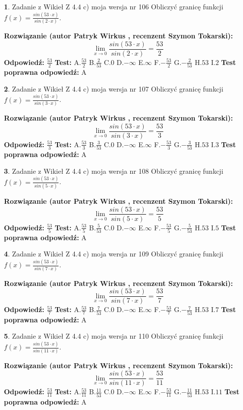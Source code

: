 \documentclass[12pt, a4paper]{article}
\theoremstyle{definition} %
\newtheorem{zad}{}
\newcommand{\zadStart}[1]{\begin{zad}#1\newline}
\newcommand{\zadStop}{\end{zad}}
\newcommand{\rozwStart}[2]{\noindent \textbf{Rozwiązanie (autor #1 , recenzent #2): }\newline}
\newcommand{\rozwStop}{\newline}
\newcommand{\odpStart}{\noindent \textbf{Odpowiedź:}\newline}
\newcommand{\odpStop}{\newline}
\newcommand{\testStart}{\noindent \textbf{Test:}\newline}
\newcommand{\testStop}{\newline}
\newcommand{\kluczStart}{\noindent \textbf{Test poprawna odpowiedź:}\newline}
\newcommand{\kluczStop}{\newline}
\begin{document}
\zadStart{Zadanie z Wikieł Z 4.4 c) moja wersja nr 106}
Obliczyć granicę funkcji $f(x)=\frac{sin(53\cdot x)}{sin(2\cdot x)}$.
\zadStop
\rozwStart{Patryk Wirkus}{Szymon Tokarski}
$$\lim\limits_{x\to 0}\frac{sin(53\cdot x)}{sin(2\cdot x)}=
\frac{53}{2}$$
\rozwStop
\odpStart
$\frac{53}{2}$
\odpStop
\testStart
A.$\frac{53}{2}$
B.$\frac{2}{53}$
C.$0$
D.$-\infty$
E.$\infty$
F.$-\frac{53}{2}$
G.$-\frac{2}{53}$
H.$53$
I.$2$
\testStop
\kluczStart
A
\kluczStop



\zadStart{Zadanie z Wikieł Z 4.4 c) moja wersja nr 107}
Obliczyć granicę funkcji $f(x)=\frac{sin(53\cdot x)}{sin(3\cdot x)}$.
\zadStop
\rozwStart{Patryk Wirkus}{Szymon Tokarski}
$$\lim\limits_{x\to 0}\frac{sin(53\cdot x)}{sin(3\cdot x)}=
\frac{53}{3}$$
\rozwStop
\odpStart
$\frac{53}{3}$
\odpStop
\testStart
A.$\frac{53}{3}$
B.$\frac{3}{53}$
C.$0$
D.$-\infty$
E.$\infty$
F.$-\frac{53}{3}$
G.$-\frac{3}{53}$
H.$53$
I.$3$
\testStop
\kluczStart
A
\kluczStop



\zadStart{Zadanie z Wikieł Z 4.4 c) moja wersja nr 108}
Obliczyć granicę funkcji $f(x)=\frac{sin(53\cdot x)}{sin(5\cdot x)}$.
\zadStop
\rozwStart{Patryk Wirkus}{Szymon Tokarski}
$$\lim\limits_{x\to 0}\frac{sin(53\cdot x)}{sin(5\cdot x)}=
\frac{53}{5}$$
\rozwStop
\odpStart
$\frac{53}{5}$
\odpStop
\testStart
A.$\frac{53}{5}$
B.$\frac{5}{53}$
C.$0$
D.$-\infty$
E.$\infty$
F.$-\frac{53}{5}$
G.$-\frac{5}{53}$
H.$53$
I.$5$
\testStop
\kluczStart
A
\kluczStop



\zadStart{Zadanie z Wikieł Z 4.4 c) moja wersja nr 109}
Obliczyć granicę funkcji $f(x)=\frac{sin(53\cdot x)}{sin(7\cdot x)}$.
\zadStop
\rozwStart{Patryk Wirkus}{Szymon Tokarski}
$$\lim\limits_{x\to 0}\frac{sin(53\cdot x)}{sin(7\cdot x)}=
\frac{53}{7}$$
\rozwStop
\odpStart
$\frac{53}{7}$
\odpStop
\testStart
A.$\frac{53}{7}$
B.$\frac{7}{53}$
C.$0$
D.$-\infty$
E.$\infty$
F.$-\frac{53}{7}$
G.$-\frac{7}{53}$
H.$53$
I.$7$
\testStop
\kluczStart
A
\kluczStop



\zadStart{Zadanie z Wikieł Z 4.4 c) moja wersja nr 110}
Obliczyć granicę funkcji $f(x)=\frac{sin(53\cdot x)}{sin(11\cdot x)}$.
\zadStop
\rozwStart{Patryk Wirkus}{Szymon Tokarski}
$$\lim\limits_{x\to 0}\frac{sin(53\cdot x)}{sin(11\cdot x)}=
\frac{53}{11}$$
\rozwStop
\odpStart
$\frac{53}{11}$
\odpStop
\testStart
A.$\frac{53}{11}$
B.$\frac{11}{53}$
C.$0$
D.$-\infty$
E.$\infty$
F.$-\frac{53}{11}$
G.$-\frac{11}{53}$
H.$53$
I.$11$
\testStop
\kluczStart
A
\kluczStop
\end{document}
